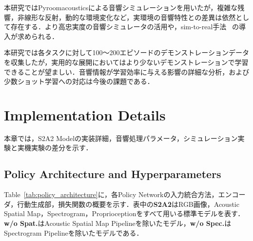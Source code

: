 \documentclass{article}
\begin{document}
	本研究ではPyroomacousticsによる音響シミュレーションを用いたが，複雑な残響，非線形な反射，動的な環境変化など，実環境の音響特性との差異は依然として存在する．より高忠実度の音響シミュレータの活用や，sim-to-real手法~ \citep{multigen2025}の導入が求められる．

	本研究では各タスクに対して100〜200エピソードのデモンストレーションデータを収集したが，実用的な展開においてはより少ないデモンストレーションで学習できることが望ましい．音響情報が学習効率に与える影響の詳細な分析，および少数ショット学習への対応は今後の課題である．

\clearpage


\clearpage

\appendix









\section{Implementation Details}
\label{sec:appendixA}
本章では，S2A2 Modelの実装詳細，音響処理パラメータ，シミュレーション実験と実機実験の差分を示す．

\subsection{Policy Architecture and Hyperparameters}
\label{sec:appendix_architecture}
Table~\ref{tab:policy_architecture}に，各Policy Networkの入力統合方法，エンコーダ，行動生成部，損失関数の概要を示す．表中の\textbf{S2A2}はRGB画像，Acoustic Spatial Map，Spectrogram，Proprioceptionをすべて用いる標準モデルを表す．\textbf{w/o Spat.}はAcoustic Spatial Map Pipelineを除いたモデル，\textbf{w/o Spec.}はSpectrogram Pipelineを除いたモデルである．
\end{document}
